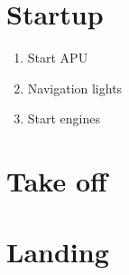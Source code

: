 \documentclass[a5paper]{article}
\begin{document}
\section*{Startup}

\begin{enumerate}
  \item Start APU
  \item Navigation lights
  \item Start engines
\end{enumerate}

\section*{Take off}

\section*{Landing}
\end{document}
